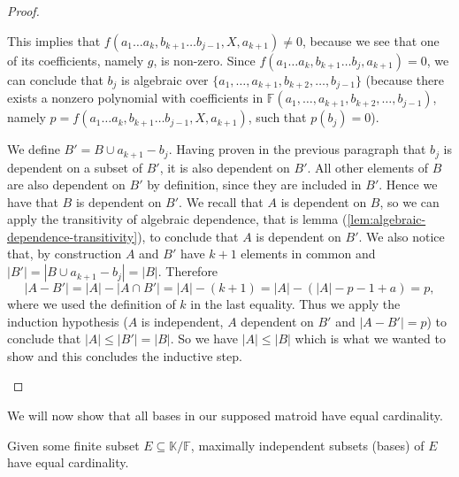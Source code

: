 \begin{proof}
\begin{enumerate}
		      This implies that $f(a _1 \ldots a _k, b _{k + 1} \ldots b _{j - 1}, X, a _{k + 1}) \neq 0$, because we see that one of its coefficients, namely $g$, is non-zero. Since $ f(a _1 \ldots a _{k}, b _{k + 1} \ldots b _{j}, a _{k + 1})  = 0$, we can conclude that $b_j$ is algebraic over $\{a _1, \ldots, a _{k + 1}, b _{k + 2} ,\ldots,b_{j-1}\}$ (because there exists a nonzero polynomial with coefficients in $\mathbb{F}(a _1, \ldots, a _{k + 1}, b _{k + 2} ,\ldots,b_{j-1})$, namely $p = f(a _1 \ldots a _k, b _{k + 1} \ldots b _{j - 1}, X, a _{k + 1})$, such that $p(b_j) = 0$).

		We define $B' = B \cup a _{k + 1} - b_j$. Having proven in the previous paragraph that $b_j$ is dependent on a subset of $B'$, it is also dependent on $B'$. All other elements of $B$ are also dependent on $B'$ by definition, since they are included in $B'$. Hence we have that $B$ is dependent on $B'$. We recall that $A$ is dependent on $B$, so we can apply the transitivity of algebraic dependence, that is lemma (\ref{lem:algebraic-dependence-transitivity}), to conclude that $A$ is dependent on $B'$. We also notice that, by construction $A$ and $B'$ have $k + 1$ elements in common and $|B'| = |B \cup a_{k+1} - b_j| = |B|$. Therefore $$|A - B'| = |A| - |A\cap B'| = |A| - (k+1) = |A| - (|A| - p - 1 + a) = p, $$ where we used the definition of $k$ in the last equality. Thus we apply the induction hypothesis ($A$ is independent, $A$ dependent on $B'$ and $|A-B'| = p$) to conclude that $|A|\leq |B'| = |B|$. So we have $|A|\leq |B|$ which is what we wanted to show and this concludes the inductive step.
	\end{enumerate}
\end{proof}

We will now show that all bases in our supposed matroid have equal cardinality.

\begin{lemma}\label{lem:algebraic-matroid-equal-size-bases}
	Given some finite subset $E \subseteq \mathbb K / \mathbb F$, maximally independent subsets (bases) of $E$ have equal cardinality.
\end{lemma}

